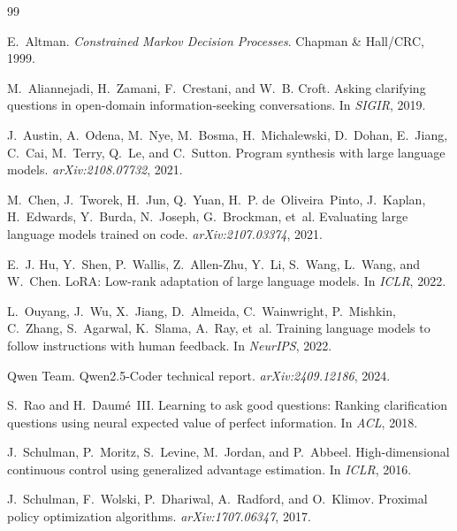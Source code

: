 \documentclass[11pt]{article}
\begin{document}

\begin{thebibliography}{99}
\small

E.~Altman. \emph{Constrained Markov Decision Processes}. Chapman \& Hall/CRC, 1999.

M.~Aliannejadi, H.~Zamani, F.~Crestani, and W.~B. Croft. Asking clarifying questions in open-domain information-seeking conversations. In \emph{SIGIR}, 2019.

J.~Austin, A.~Odena, M.~Nye, M.~Bosma, H.~Michalewski, D.~Dohan, E.~Jiang, C.~Cai, M.~Terry, Q.~Le, and C.~Sutton. Program synthesis with large language models. \emph{arXiv:2108.07732}, 2021.

M.~Chen, J.~Tworek, H.~Jun, Q.~Yuan, H.~P. de~Oliveira~Pinto, J.~Kaplan, H.~Edwards, Y.~Burda, N.~Joseph, G.~Brockman, et~al. Evaluating large language models trained on code. \emph{arXiv:2107.03374}, 2021.

E.~J. Hu, Y.~Shen, P.~Wallis, Z.~Allen-Zhu, Y.~Li, S.~Wang, L.~Wang, and W.~Chen. {LoRA}: Low-rank adaptation of large language models. In \emph{ICLR}, 2022.

L.~Ouyang, J.~Wu, X.~Jiang, D.~Almeida, C.~Wainwright, P.~Mishkin, C.~Zhang, S.~Agarwal, K.~Slama, A.~Ray, et~al. Training language models to follow instructions with human feedback. In \emph{NeurIPS}, 2022.

Qwen Team. Qwen2.5-Coder technical report. \emph{arXiv:2409.12186}, 2024.

S.~Rao and H.~Daum{\'e}~III. Learning to ask good questions: Ranking clarification questions using neural expected value of perfect information. In \emph{ACL}, 2018.

J.~Schulman, P.~Moritz, S.~Levine, M.~Jordan, and P.~Abbeel. High-dimensional continuous control using generalized advantage estimation. In \emph{ICLR}, 2016.

J.~Schulman, F.~Wolski, P.~Dhariwal, A.~Radford, and O.~Klimov. Proximal policy optimization algorithms. \emph{arXiv:1707.06347}, 2017.


\end{thebibliography}
\end{document}
